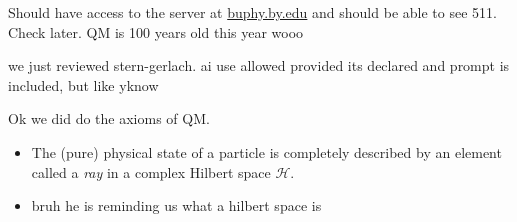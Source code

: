 
Should have access to the server at \url{buphy.by.edu} and should be able to see 511. Check later. QM is 100 years old this year wooo

we just reviewed stern-gerlach. ai use allowed provided its declared and prompt is included, but like yknow

Ok we did do the axioms of QM.
\begin{itemize}
	\item The (pure) physical state of a particle is completely described by an element called a \emph{ray} in a complex Hilbert space $\mathcal{H} $.
	\item bruh he is reminding us what a hilbert space is
\end{itemize}

